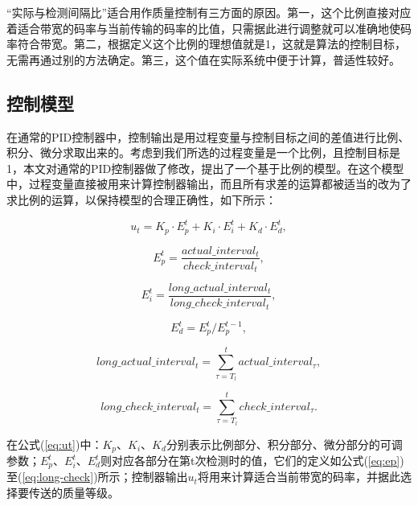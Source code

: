 “实际与检测间隔比”适合用作质量控制有三方面的原因。第一，这个比例直接对应着适合带宽的码率与当前传输的码率的比值，只需据此进行调整就可以准确地使码率符合带宽。第二，根据定义这个比例的理想值就是1，这就是算法的控制目标，无需再通过别的方法确定。第三，这个值在实际系统中便于计算，普适性较好。

\subsection{控制模型}

在通常的PID控制器中，控制输出是用过程变量与控制目标之间的差值进行比例、积分、微分求取出来的。考虑到我们所选的过程变量是一个比例，且控制目标是1，本文对通常的PID控制器做了修改，提出了一个基于比例的模型。在这个模型中，过程变量直接被用来计算控制器输出，而且所有求差的运算都被适当的改为了求比例的运算，以保持模型的合理正确性，如下所示：

\begin{equation}
\label{eq:ut}
{u_t} = {K_p} \cdot E_p^t + {K_i} \cdot E_i^t + {K_d} \cdot E_d^t ,
\end{equation}

\begin{equation}
\label{eq:ep}
E_p^t = \frac{{actual\_interva{l_t}}}{{check\_interva{l_t}}} ,
\end{equation}

\begin{equation}
\label{eq:ei}
E_i^t = \frac{{long\_actual\_interva{l_t}}}{{long\_check\_interva{l_t}}} ,
\end{equation}

\begin{equation}
\label{eq:ed}
E_d^t = E_p^t/E_p^{t - 1} ,
\end{equation}

\begin{equation}
\label{eq:long-actual}
long\_actual\_interva{l_t} = \sum\limits_{\tau = {T_l}}^t {actual\_interva{l_\tau}} ,
\end{equation}

\begin{equation}
\label{eq:long-check}
long\_check\_interva{l_t} = \sum\limits_{\tau = {T_l}}^t {check\_interva{l_\tau}} .
\end{equation}

在公式(\ref{eq:ut})中：$K_p$、$K_i$、$K_d$分别表示比例部分、积分部分、微分部分的可调参数；$E_p^t$、$E_i^t$、$E_d^t$则对应各部分在第t次检测时的值，它们的定义如公式(\ref{eq:ep})至(\ref{eq:long-check})所示；控制器输出$u_t$将用来计算适合当前带宽的码率，并据此选择要传送的质量等级。

